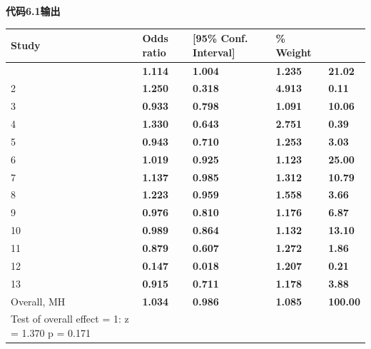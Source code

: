 \documentclass[
  chinese-hans,
  letterpaper,
  DIV=11,
  numbers=noendperiod]{scrreprt}
\newcounter{none} %
\begin{document}
\begin{tcolorbox}[enhanced jigsaw, arc=.35mm, bottomrule=.15mm, breakable, colback=white, colframe=quarto-callout-note-color-frame, left=2mm, leftrule=.75mm, opacityback=0, rightrule=.15mm, toprule=.15mm]

\vspace{-3mm}\textbf{代码6.1输出}\vspace{3mm}

{\def\LTcaptype{none} %
\begin{longtable}[]{@{}lllll@{}}
\toprule\noalign{}
Study & Odds ratio & {[}95\% Conf. Interval{]} & \% Weight & \\
\midrule\noalign{}
\endhead
\bottomrule\noalign{}
\endlastfoot
1 & \textbf{1.114} & \textbf{1.004} & \textbf{1.235} & \textbf{21.02} \\
2 & \textbf{1.250} & \textbf{0.318} & \textbf{4.913} & \textbf{0.11} \\
3 & \textbf{0.933} & \textbf{0.798} & \textbf{1.091} & \textbf{10.06} \\
4 & \textbf{1.330} & \textbf{0.643} & \textbf{2.751} & \textbf{0.39} \\
5 & \textbf{0.943} & \textbf{0.710} & \textbf{1.253} & \textbf{3.03} \\
6 & \textbf{1.019} & \textbf{0.925} & \textbf{1.123} & \textbf{25.00} \\
7 & \textbf{1.137} & \textbf{0.985} & \textbf{1.312} & \textbf{10.79} \\
8 & \textbf{1.223} & \textbf{0.959} & \textbf{1.558} & \textbf{3.66} \\
9 & \textbf{0.976} & \textbf{0.810} & \textbf{1.176} & \textbf{6.87} \\
10 & \textbf{0.989} & \textbf{0.864} & \textbf{1.132} &
\textbf{13.10} \\
11 & \textbf{0.879} & \textbf{0.607} & \textbf{1.272} & \textbf{1.86} \\
12 & \textbf{0.147} & \textbf{0.018} & \textbf{1.207} & \textbf{0.21} \\
13 & \textbf{0.915} & \textbf{0.711} & \textbf{1.178} & \textbf{3.88} \\
Overall, MH & \textbf{1.034} & \textbf{0.986} & \textbf{1.085} &
\textbf{100.00} \\
Test of overall effect = 1: z = 1.370 p = 0.171 & & & & \\
\end{longtable}
}

\end{tcolorbox}
\end{document}
